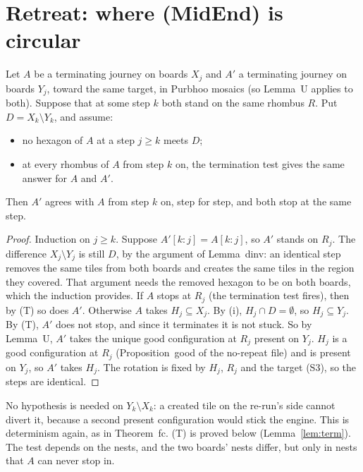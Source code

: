 \documentclass[11pt]{article}
\theoremstyle{definition}\newtheorem{definition}[theorem]{Definition}\newtheorem{remark}[theorem]{Remark}
\begin{document}
\section{Retreat: where (MidEnd) is circular}\label{sec:midend}
\begin{lemma}\label{lem:suffix}
Let $A$ be a terminating journey on boards $X_j$ and $A'$ a terminating journey on boards $Y_j$, toward the same target, in Purbhoo mosaics (so Lemma~U applies to both). Suppose that at some step $k$ both stand on the same rhombus $R$. Put $D=X_k\setminus Y_k$, and assume:
\begin{itemize}
\item[(i)] no hexagon of $A$ at a step $j\ge k$ meets $D$;
\item[(T)] at every rhombus of $A$ from step $k$ on, the termination test gives the same answer for $A$ and $A'$.
\end{itemize}
Then $A'$ agrees with $A$ from step $k$ on, step for step, and both stop at the same step.
\end{lemma}
\begin{proof}
Induction on $j\ge k$. Suppose $A'[k{:}j]=A[k{:}j]$, so $A'$ stands on $R_j$. The difference $X_j\setminus Y_j$ is still $D$, by the argument of Lemma~dinv: an identical step removes the same tiles from both boards and creates the same tiles in the region they covered. That argument needs the removed hexagon to be on both boards, which the induction provides.
If $A$ stops at $R_j$ (the termination test fires), then by (T) so does $A'$.
Otherwise $A$ takes $H_j\subseteq X_j$. By (i), $H_j\cap D=\emptyset$, so $H_j\subseteq Y_j$. By (T), $A'$ does not stop, and since it terminates it is not stuck. So by Lemma~U, $A'$ takes the unique good configuration at $R_j$ present on $Y_j$. $H_j$ is a good configuration at $R_j$ (Proposition~good of the no-repeat file) and is present on $Y_j$, so $A'$ takes $H_j$. The rotation is fixed by $H_j$, $R_j$ and the target (S3), so the steps are identical.
\end{proof}
\noindent No hypothesis is needed on $Y_k\setminus X_k$: a created tile on the re-run's side cannot divert it, because a second present configuration would stick the engine. This is determinism again, as in Theorem~fc.
(T) is proved below (Lemma~\ref{lem:term}). The test depends on the nests, and the two boards' nests differ, but only in nests that $A$ can never stop in.
\end{document}
